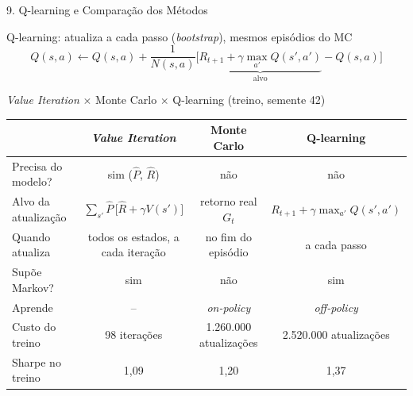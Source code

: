 \documentclass[aspectratio=169,10pt,t]{beamer}
\begin{document}
\begin{frame}{9. Q-learning e Comparação dos Métodos}

  \begin{block}{Q-learning: atualiza a cada passo (\textit{bootstrap}), mesmos episódios do MC}
    \[
      Q(s,a) \leftarrow Q(s,a) + \frac{1}{N(s,a)}\Big[\underbrace{R_{t+1} + \gamma \max_{a'} Q(s',a')}_{\text{alvo}} - Q(s,a)\Big]
    \]
  \end{block}

  \vskip 0.1cm

  \begin{block}{\textit{Value Iteration} $\times$ Monte Carlo $\times$ Q-learning (treino, semente 42)}
    \centering\scriptsize
    \setlength{\tabcolsep}{6pt}
    \renewcommand{\arraystretch}{1.0}
    \begin{tabular}{l ccc}
      \toprule
      & \textbf{\textit{Value Iteration}} & \textbf{Monte Carlo} & \textbf{Q-learning} \\
      \midrule
      Precisa do modelo?       & sim ($\widehat{P}$, $\widehat{R}$)                          & não                       & não \\
      Alvo da atualização      & $\sum_{s'} \widehat{P}\,\big[\widehat{R} + \gamma V(s')\big]$ & retorno real $G_t$        & $R_{t+1} + \gamma \max_{a'} Q(s',a')$ \\
      Quando atualiza          & todos os estados, a cada iteração                         & no fim do episódio        & a cada passo \\
      Supõe Markov?            & sim                                                       & não                       & sim \\
      Aprende                  & --                                                        & \textit{on-policy}        & \textit{off-policy} \\
      \midrule
      Custo do treino          & 98 iterações                                              & 1.260.000 atualizações    & 2.520.000 atualizações \\
      Sharpe no treino         & 1,09                                                      & 1,20                     & 1,37 \\
      \bottomrule
    \end{tabular}
  \end{block}

\end{frame}
\end{document}
